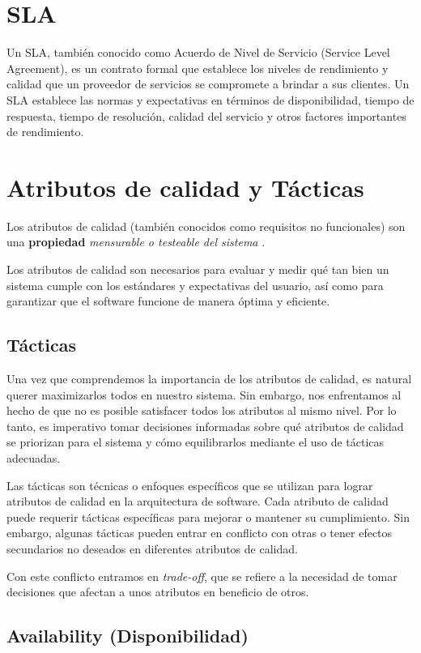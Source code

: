 \documentclass{article}
\begin{document}
		\section{SLA}\label{sec:sla}
		Un SLA, también conocido como Acuerdo de Nivel de Servicio (Service Level Agreement), es un contrato formal que establece los niveles de rendimiento y calidad que un proveedor de servicios se compromete a brindar a sus clientes. Un SLA establece las normas y expectativas en términos de disponibilidad, tiempo de respuesta, tiempo de resolución, calidad del servicio y otros factores importantes de rendimiento.
		
		
		\section{Atributos de calidad y Tácticas}
			Los atributos de calidad (también conocidos como requisitos no funcionales) son una \textbf{propiedad} \textit{mensurable o testeable del sistema} .
			
			Los atributos de calidad son necesarios para evaluar y medir qué tan bien un sistema cumple con los estándares y expectativas del usuario, así como para garantizar que el software funcione de manera óptima y eficiente.

			
		\subsection{Tácticas}
			Una vez que comprendemos la importancia de los atributos de calidad, es natural querer maximizarlos todos en nuestro sistema. Sin embargo, nos enfrentamos al hecho de que no es posible satisfacer todos los atributos al mismo nivel. Por lo tanto, es imperativo tomar decisiones informadas sobre qué atributos de calidad se priorizan para el sistema y cómo equilibrarlos mediante el uso de tácticas adecuadas.
			
			Las tácticas son técnicas o enfoques específicos que se utilizan para lograr atributos de calidad en la arquitectura de software. Cada atributo de calidad puede requerir tácticas específicas para mejorar o mantener su cumplimiento. Sin embargo, algunas tácticas pueden entrar en conflicto con otras o tener efectos secundarios no deseados en diferentes atributos de calidad.
			
			Con este conflicto entramos en \textit{trade-off}, que se refiere a la necesidad de tomar decisiones que afectan a unos atributos en beneficio de otros.

		
		\subsection{Availability \small{(Disponibilidad)}}
		
\end{document}
